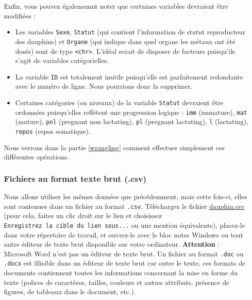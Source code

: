 \documentclass[a4paperpaper,]{article}
\providecommand{\tightlist}{%
  \setlength{\itemsep}{0pt}\setlength{\parskip}{0pt}}
\begin{document}
Enfin, vous pouvez égalememnt noter que certaines variables devraient être modifiées :

\begin{itemize}
\tightlist
\item
  Les variables \texttt{Sexe}, \texttt{Statut} (qui contient l'information de statut reproducteur des dauphins) et \texttt{Organe} (qui indique dans quel organe les métaux ont été dosés) sont de type \texttt{\textless{}chr\textgreater{}}. L'idéal serait de disposer de facteurs puisqu'ils s'agit de variables catégorielles.
\item
  La variable \texttt{ID} est totalement inutile puisqu'elle est parfaitement redondante avec le numéro de ligne. Nous pourrions donc la supprimer.
\item
  Certaines catégories (ou niveaux) de la variable \texttt{Statut} devraient être ordonnées puisqu'elles reflètent une progression logique : \texttt{imm} (immature), \texttt{mat} (mature), \texttt{pnl} (pregnant non lactating), \texttt{pl} (pregnant lactating), \texttt{l} (lactating), \texttt{repos} (repos somatique).
\end{itemize}

Nous verrons dans la partie \ref{wrangling} comment effectuer simplement ces différentes opérations.

\hypertarget{plaintext}{%
\subsubsection{Fichiers au format texte brut (.csv)}\label{plaintext}}

Nous allons utiliser les mêmes données que précédemment, mais cette fois-ci, elles sont contenues dans un fichier au format \texttt{.csv}. Téléchargez le fichier \href{data/dauphin.csv}{dauphin.csv} (pour cela, faites un clic droit sur le lien et choisissez \texttt{Enregistrez\ la\ cible\ du\ lien\ sous...} ou une mention équivalente), placez-le dans votre répertoire de travail, et ouvrez-le avec le bloc notes Windows ou tout autre éditeur de texte brut disponible sur votre ordinateur. \textbf{Attention} : Microsoft Word n'est pas un éditeur de texte brut. Un fichier au format \texttt{.doc} ou \texttt{.docx} est illisible dans un éditeur de texte brut car outre le texte, ces formats de documents contiennent toutes les informations concernant la mise en forme du texte (polices de caractères, tailles, couleurs et autres attributs, présence de figures, de tableaux dans le document, etc.).
\end{document}
